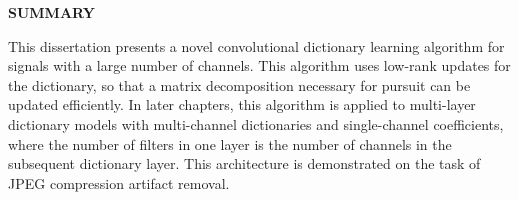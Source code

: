 \clearpage
\begin{centering}
\textbf{SUMMARY}\\
\vspace{\baselineskip}
\end{centering}

This dissertation presents a novel convolutional dictionary learning algorithm for signals with a large number of channels. This algorithm uses low-rank updates for the dictionary, so that a matrix decomposition necessary for pursuit can be updated efficiently. In later chapters, this algorithm is applied to multi-layer dictionary models with multi-channel dictionaries and single-channel coefficients, where the number of filters in one layer is the number of channels in the subsequent dictionary layer. This architecture is demonstrated on the task of JPEG compression artifact removal.


